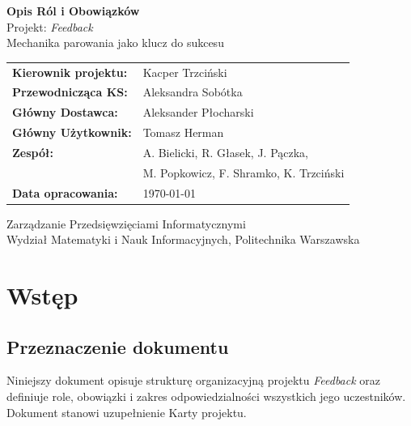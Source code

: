 \documentclass[11pt,a4paper]{article}
\begin{document}
\begin{titlepage}
\centering
\vspace*{2cm}
{\LARGE\bfseries\color{accent} Opis Ról i Obowiązków}\\[0.5cm]
{\large Projekt: \textit{Feedback}}\\[0.3cm]
{\normalsize Mechanika parowania jako klucz do sukcesu}\\[2cm]

\begin{tabular}{ll}
\textbf{Kierownik projektu:}   & Kacper Trzciński \\[0.3em]
\textbf{Przewodnicząca KS:}    & Aleksandra Sobótka \\[0.3em]
\textbf{Główny Dostawca:}      & Aleksander Płocharski \\[0.3em]
\textbf{Główny Użytkownik:}    & Tomasz Herman \\[0.3em]
\textbf{Zespół:}               & A. Bielicki, R. Głasek, J. Pączka, \\
                               & M. Popkowicz, F. Shramko, K. Trzciński \\[0.3em]
\textbf{Data opracowania:}     & \today \\[0.3em]
\end{tabular}

\vfill
{\small Zarządzanie Przedsięwzięciami Informatycznymi\\
Wydział Matematyki i Nauk Informacyjnych, Politechnika Warszawska}
\end{titlepage}

\tableofcontents
\newpage

\section{Wstęp}

\subsection{Przeznaczenie dokumentu}
Niniejszy dokument opisuje strukturę organizacyjną projektu \textit{Feedback} oraz definiuje role, obowiązki i zakres odpowiedzialności wszystkich jego uczestników. Dokument stanowi uzupełnienie Karty projektu.
\end{document}
